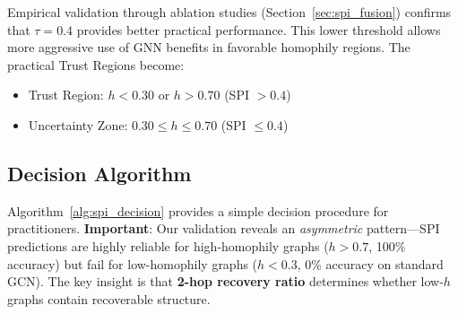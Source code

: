 Empirical validation through ablation studies (Section~\ref{sec:spi_fusion}) confirms that $\tau = 0.4$ provides better practical performance. This lower threshold allows more aggressive use of GNN benefits in favorable homophily regions. The practical Trust Regions become:
\begin{itemize}
    \item Trust Region: $h < 0.30$ or $h > 0.70$ (SPI $> 0.4$)
    \item Uncertainty Zone: $0.30 \leq h \leq 0.70$ (SPI $\leq 0.4$)
\end{itemize}

\subsection{Decision Algorithm}

Algorithm~\ref{alg:spi_decision} provides a simple decision procedure for practitioners. \textbf{Important}: Our validation reveals an \textit{asymmetric} pattern---SPI predictions are highly reliable for high-homophily graphs ($h > 0.7$, 100\% accuracy) but fail for low-homophily graphs ($h < 0.3$, 0\% accuracy on standard GCN). The key insight is that \textbf{2-hop recovery ratio} determines whether low-$h$ graphs contain recoverable structure.

